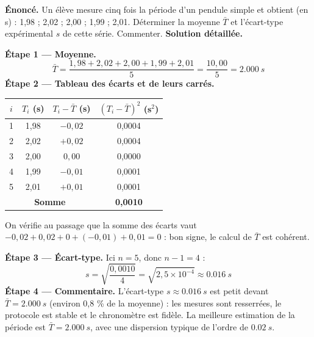 \documentclass[11pt]{article}
\begin{document}
\begin{exoresolu}
\textbf{Énoncé.} Un élève mesure cinq fois la période d'un pendule simple et obtient (en s) : 1,98 ; 2,02 ; 2,00 ; 1,99 ; 2,01. Déterminer la moyenne $\bar{T}$ et l'écart-type expérimental $s$ de cette série. Commenter.
\tcblower
\textbf{Solution détaillée.}\par
\textbf{Étape 1 — Moyenne.}
\[ \bar{T} = \frac{1,98 + 2,02 + 2,00 + 1,99 + 2,01}{5} = \frac{10,00}{5} = \SI{2,000}{s} \]
\textbf{Étape 2 — Tableau des écarts et de leurs carrés.}
\begin{center}
\begin{tabular}{|c|c|c|c|}
\hline
\rowcolor{popblueL} $i$ & $T_i$ (s) & $T_i - \bar{T}$ (s) & $(T_i - \bar{T})^2$ (s$^2$) \\
\hline
1 & 1,98 & $-0,02$ & 0,0004 \\
\hline
2 & 2,02 & $+0,02$ & 0,0004 \\
\hline
3 & 2,00 & $0,00$ & 0,0000 \\
\hline
4 & 1,99 & $-0,01$ & 0,0001 \\
\hline
5 & 2,01 & $+0,01$ & 0,0001 \\
\hline
\multicolumn{3}{|c|}{\textbf{Somme}} & \textbf{0,0010} \\
\hline
\end{tabular}
\end{center}
On vérifie au passage que la somme des écarts vaut $-0,02 + 0,02 + 0 + (-0,01) + 0,01 = 0$ : bon signe, le calcul de $\bar{T}$ est cohérent.\par
\textbf{Étape 3 — Écart-type.} Ici $n = 5$, donc $n - 1 = 4$ :
\[ s = \sqrt{\frac{0,0010}{4}} = \sqrt{2,5 \times 10^{-4}} \approx \SI{0,016}{s} \]
\textbf{Étape 4 — Commentaire.} L'écart-type $s \approx \SI{0,016}{s}$ est petit devant $\bar{T} = \SI{2,000}{s}$ (environ 0,8 \% de la moyenne) : les mesures sont resserrées, le protocole est stable et le chronomètre est fidèle. La meilleure estimation de la période est $\bar{T} = \SI{2,000}{s}$, avec une dispersion typique de l'ordre de $\SI{0,02}{s}$.
\end{exoresolu}
\end{document}
